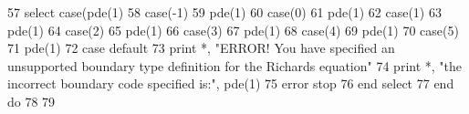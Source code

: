 \begin{DoxyCode}
57         \textcolor{keywordflow}{select case}(pde(1)%
58           \textcolor{keywordflow}{case}(-1)
59               pde(1)%
60           \textcolor{keywordflow}{case}(0)
61             pde(1)%
62           \textcolor{keywordflow}{case}(1)
63             pde(1)%
64           \textcolor{keywordflow}{case}(2)
65             pde(1)%
66           \textcolor{keywordflow}{case}(3)
67             pde(1)%
68           \textcolor{keywordflow}{case}(4)
69             pde(1)%
70           \textcolor{keywordflow}{case}(5)
71             pde(1)%
72 \textcolor{keywordflow}{          case default}
73                 print *, \textcolor{stringliteral}{"ERROR! You have specified an unsupported boundary type definition for the
       Richards equation"}
74                 print *, \textcolor{stringliteral}{"the incorrect boundary code specified is:"}, pde(1)%
75                 error stop
76 \textcolor{keywordflow}{        end select}
77 \textcolor{keywordflow}{      end do} 
78 
79    
\end{DoxyCode}


